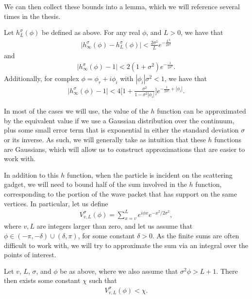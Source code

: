 \documentclass[../thesis-main/thesis-main]{subfiles}
\begin{document}
We can then collect these bounds into a lemma, which we will reference several times in the thesis.
\begin{lemma}
\label{lem:h_bounds}
  Let $h_L^\sigma(\phi)$ be defined as above.  For any real $\phi$, and $L>0$, we have that
  \begin{align}
    \big| h_\infty^\sigma(\phi) - h_L^\sigma(\phi)\big| < \frac{2\sigma^2}{L} e^{-\frac{L^2}{2\sigma^2}}\label{eq:hL_bound}
  \end{align}
  and
  \begin{align}
    \big|h_\infty^\sigma(\phi) - 1\big| < 2(1 + \sigma^2) e^{-\frac{1}{2\sigma^2}}\label{eq:h_infinity_bound}.
  \end{align}
  Additionally, for complex $\phi = \phi_r + i \phi_i$ with $|\phi_i|\sigma^2 < 1$, we have that
  \begin{align}
    \big| h_\infty^\sigma(\phi) - 1\big| < 4 \bigg[1 + \frac{\sigma^2}{1 - \sigma^2 |\phi_i|} \bigg]e^{-\frac{1}{2\sigma^2} + |\phi_i|}\label{eq:h_complex_bound}.
  \end{align}
\end{lemma}

In most of the cases we will use, the value of the $h$ function can be approximated by the equivalent value if we use a Gaussian distribution over the continuum, plus some small error term that is exponential in either the standard deviation $\sigma$ or its inverse.  As such, we will generally take as intuition that these $h$ functions are Gaussians, which will allow us to construct approximations that are easier to work with.




In addition to this $h$ function, when the particle is incident on the scattering gadget, we will need to bound half of the sum involved in the $h$ function, corresponding to the portion of the wave packet that has support on the same vertices.  In particular, let us define
\begin{align}
  V_{v,L}^{\sigma}(\phi) = \sum_{x=v}^L e^{i\phi x} e^{- x^2/2\sigma^2},
\end{align}
where $v,L$ are integers larger than zero, and let us assume that $\phi \in (-\pi,-\delta) \cup (\delta, \pi)$, for some constant $\delta>0$. As the finite sums are often difficult to work with, we will try to approximate the sum via an integral over the points of interest. 
\begin{lemma}
  Let $v$, $L$, $\sigma$, and $\phi$ be as above, where we also assume that $\sigma^2 \phi > L+1$.  There then exists some constant $\chi$ such that
  \begin{align}
    V_{v,L}^\sigma(\phi) < \chi.
  \end{align}
\label{lem:tail_bounds}
\end{lemma}
\end{document}
